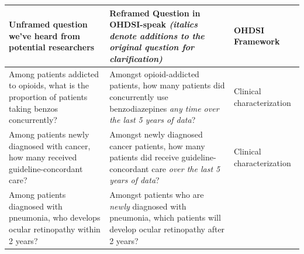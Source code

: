 \documentclass[11pt]{book}
\theoremstyle{definition}
\theoremstyle{definition}
\theoremstyle{definition}
\theoremstyle{remark}
\begin{document}
\begin{longtable}[]{@{}lll@{}}
\toprule
\begin{minipage}[b]{0.30\columnwidth}\raggedright
Unframed question we've heard from potential researchers\strut
\end{minipage} & \begin{minipage}[b]{0.30\columnwidth}\raggedright
Reframed Question in OHDSI-speak \emph{(italics denote additions to the original question for clarification)}\strut
\end{minipage} & \begin{minipage}[b]{0.30\columnwidth}\raggedright
OHDSI Framework\strut
\end{minipage}\tabularnewline
\midrule
\endhead
\begin{minipage}[t]{0.30\columnwidth}\raggedright
Among patients addicted to opioids, what is the proportion of patients taking benzos concurrently?\strut
\end{minipage} & \begin{minipage}[t]{0.30\columnwidth}\raggedright
Amongst opioid-addicted patients, how many patients did concurrently use benzodiazepines \emph{any time over the last 5 years of data}?\strut
\end{minipage} & \begin{minipage}[t]{0.30\columnwidth}\raggedright
Clinical characterization\strut
\end{minipage}\tabularnewline
\begin{minipage}[t]{0.30\columnwidth}\raggedright
Among patients newly diagnosed with cancer, how many received guideline-concordant care?\strut
\end{minipage} & \begin{minipage}[t]{0.30\columnwidth}\raggedright
Amongst newly diagnosed cancer patients, how many patients did receive guideline-concordant care \emph{over the last 5 years of data}?\strut
\end{minipage} & \begin{minipage}[t]{0.30\columnwidth}\raggedright
Clinical characterization\strut
\end{minipage}\tabularnewline
\begin{minipage}[t]{0.30\columnwidth}\raggedright
Among patients diagnosed with pneumonia, who develops ocular retinopathy within 2 years?\strut
\end{minipage} & \begin{minipage}[t]{0.30\columnwidth}\raggedright
Amongst patients who are \emph{newly} diagnosed with pneumonia, which patients will develop ocular retinopathy after 2 years?\strut

\end{minipage}
\end{longtable}
\end{document}
